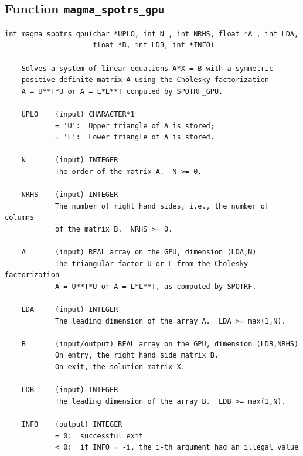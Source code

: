 \documentclass[10pt]{book}
\begin{document}
\newpage
\subsection{Function {\tt {\bf magma\_spotrs\_gpu}}}
\begin{verbatim}
int magma_spotrs_gpu(char *UPLO, int N , int NRHS, float *A , int LDA,
                     float *B, int LDB, int *INFO)

    Solves a system of linear equations A*X = B with a symmetric
    positive definite matrix A using the Cholesky factorization
    A = U**T*U or A = L*L**T computed by SPOTRF_GPU.

    UPLO    (input) CHARACTER*1
            = 'U':  Upper triangle of A is stored;
            = 'L':  Lower triangle of A is stored.

    N       (input) INTEGER
            The order of the matrix A.  N >= 0.

    NRHS    (input) INTEGER
            The number of right hand sides, i.e., the number of columns
            of the matrix B.  NRHS >= 0.

    A       (input) REAL array on the GPU, dimension (LDA,N)
            The triangular factor U or L from the Cholesky factorization
            A = U**T*U or A = L*L**T, as computed by SPOTRF.

    LDA     (input) INTEGER
            The leading dimension of the array A.  LDA >= max(1,N).

    B       (input/output) REAL array on the GPU, dimension (LDB,NRHS)
            On entry, the right hand side matrix B.
            On exit, the solution matrix X.

    LDB     (input) INTEGER
            The leading dimension of the array B.  LDB >= max(1,N).

    INFO    (output) INTEGER
            = 0:  successful exit
            < 0:  if INFO = -i, the i-th argument had an illegal value
\end{verbatim}


\newpage
\end{document}

